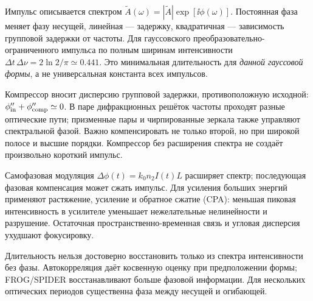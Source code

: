 
Импульс описывается спектром $\widetilde A(\omega)=|\widetilde A|\exp[\ii\phi(\omega)]$. Постоянная фаза меняет фазу несущей, линейная — задержку, квадратичная — зависимость групповой задержки от частоты. Для гауссовского преобразовательно-ограниченного импульса по полным ширинам интенсивности $\Delta t\,\Delta\nu=2\ln2/\pi\simeq0.441$. Это минимальная длительность для \emph{данной гауссовой формы}, а не универсальная константа всех импульсов.

Компрессор вносит дисперсию групповой задержки, противоположную исходной: $\phi''_{\rm in}+\phi''_{\rm comp}\simeq0$. В паре дифракционных решёток частоты проходят разные оптические пути; призменные пары и чирпированные зеркала также управляют спектральной фазой. Важно компенсировать не только второй, но при широкой полосе и высшие порядки. Компрессор без расширения спектра не создаёт произвольно короткий импульс.

Самофазовая модуляция $\Delta\phi(t)=k_0n_2I(t)L$ расширяет спектр; последующая фазовая компенсация может сжать импульс. Для усиления больших энергий применяют растяжение, усиление и обратное сжатие (CPA): меньшая пиковая интенсивность в усилителе уменьшает нежелательные нелинейности и разрушение. Остаточная пространственно-временная связь и угловая дисперсия ухудшают фокусировку.

Длительность нельзя достоверно восстановить только из спектра интенсивности без фазы. Автокорреляция даёт косвенную оценку при предположении формы; FROG/SPIDER восстанавливают больше фазовой информации. Для нескольких оптических периодов существенна фаза между несущей и огибающей.

